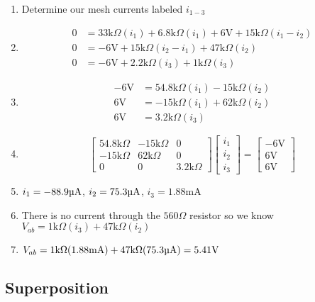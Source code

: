 \documentclass[12pt]{article}
\def\k{\mathrm{k}}
\def\V{\mathrm{V}}
\def\A{\mathrm{A}}
\def\m{\mathrm{m}}
\def\u{\textrm{\textmu}}
\begin{document}
\begin{enumerate}
	\item Determine our mesh currents labeled $i_{1-3}$
	\item \begin{align*}
		      0 & =33\k\Omega(i_1)+6.8\k\Omega(i_1)+6\V+15\k\Omega(i_1-i_2) \\
		      0 & =-6\V+15\k\Omega(i_2-i_1)+47\k\Omega(i_2)                 \\
		      0 & =-6\V+2.2\k\Omega(i_3)+1\k\Omega(i_3)
	      \end{align*}
	\item \begin{align*}
		      -6\V & = 54.8\k\Omega(i_1)-15\k\Omega(i_2) \\
		      6\V  & = -15\k\Omega(i_1)+62\k\Omega(i_2)  \\
		      6\V  & = 3.2\k\Omega(i_3)
	      \end{align*}
	\item \[
		      \begin{bmatrix}
			      54.8\k\Omega & -15\k\Omega & 0           \\
			      -15\k\Omega  & 62\k\Omega  & 0           \\
			      0            & 0           & 3.2\k\Omega
		      \end{bmatrix}
		      \begin{bmatrix}
			      i_1 \\
			      i_2 \\
			      i_3
		      \end{bmatrix}
		      =
		      \begin{bmatrix}
			      -6\V \\
			      6\V  \\
			      6\V
		      \end{bmatrix}
	      \]
	\item $i_1=-88.9\u\A$, $i_2=75.3\u\A$, $i_3=1.88\m\A$
	\item There is no current through the $560\Omega$ resistor so we know $V_{ab}=1\k\Omega(i_3)+47\k\Omega(i_2)$
	\item $V_{ab}=1\k\Omega(1.88\m\A)+47\k\Omega(75.3\u\A)=5.41\V$
\end{enumerate}

\clearpage

\subsection{Superposition}
\end{document}
